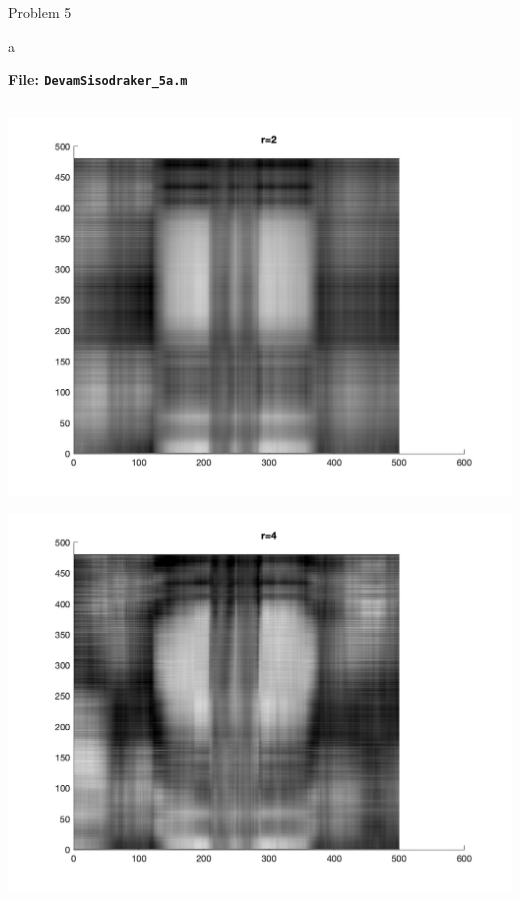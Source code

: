 \begin{section}{Problem 5}
    \newpage

    \begin{solution}{a}
        \begin{mdframed}
            \footnotesize
            \textbf{File: {\tt DevamSisodraker\_5a.m}}
            \inputminted{matlab}{DevamSisodraker_5a.m}
            \normalfont
        \end{mdframed}

        \continued

        \begin{mdframed}
            \includegraphics[scale=0.33]{DevamSisodraker_5a_2.jpg}
        \end{mdframed}

        \continued

        \begin{mdframed}
            \includegraphics[scale=0.33]{DevamSisodraker_5a_4.jpg}
        \end{mdframed}


\end{solution}
\end{section}
